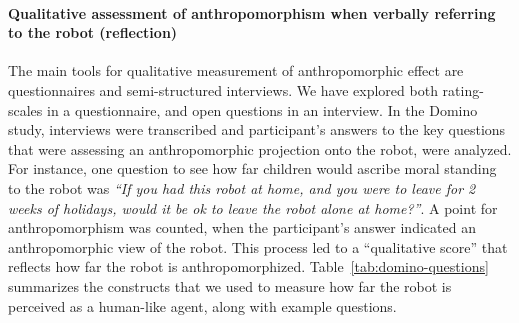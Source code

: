 \documentclass{frontiersSCNS} %
\begin{document}
\paragraph{Qualitative assessment of anthropomorphism when verbally referring to
the robot (reflection)\\}

The main tools for qualitative measurement of anthropomorphic effect are
questionnaires and semi-structured interviews. We have explored both
rating-scales in a questionnaire, and open questions in an interview.  In the
Domino study, interviews were transcribed and participant's answers to the key
questions that were assessing an anthropomorphic projection onto the robot, were
analyzed. For instance, one question to see how far children would ascribe moral
standing to the robot was \emph{``If you had this robot at home, and you were to
leave for 2 weeks of holidays, would it be ok to leave the robot alone at
home?''}. A point for anthropomorphism was counted, when the participant's
answer indicated an anthropomorphic view of the robot. This process led to a
``qualitative score'' that reflects how far the robot is anthropomorphized.
Table~\ref{tab:domino-questions} summarizes the constructs that we used to
measure how far the robot is perceived as a human-like agent, along with example
questions.
\end{document}
